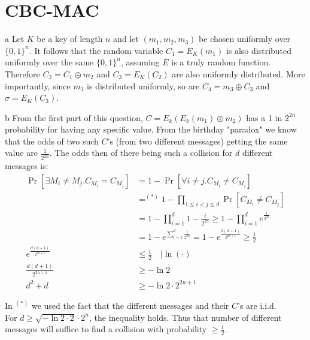 \documentclass{article}
\begin{document}
\section{CBC-MAC}
\begin{paragraph}
	a Let $K$ be a key of length $n$ and let $(m_1, m_2, m_3)$ be chosen uniformly over $\{0, 1\}^n$. It follows that the random variable $C_1 = E_K(m_1)$ is also distributed uniformly over the same $\{0, 1\}^n$, assuming $E$ is a truly random function. Therefore $C_2 = C_1 \oplus m_2$ and $C_3 = E_K(C_2)$ are also uniformly distributed. More importantly, since $m_3$ is distributed uniformly, so are $C_4 = m_3 \oplus C_3$ and $\sigma = E_K(C_3)$.
\end{paragraph}

\begin{paragraph}
    b From the first part of this question, $C = E_k(E_k(m_1) \oplus m_2)$ has a 1 in $2^{2n}$ probability for having any specific value. From the birthday "paradox" we know that the odds of two such $C$'s (from two different messages) getting the same value are $\frac{1}{2^{2n}}$. The odds then of there being such a collision for $d$ different messages is:
    \begin{align*}
        \Pr[\exists M_i \neq M_j. C_{M_i} = C_{M_j}] &= 1 - \Pr[\forall i \neq j. C_{M_i} \neq C_{M_j}]\\
        &=^{(*)} 1 - \prod\limits_{1 \leq i < j \leq d}\Pr[C_{M_i} \neq C_{M_j}]\\
        &= 1 - \prod\limits_{i = 1}^d 1 - \frac{i}{2^{2n}} \geq 1 - \prod\limits_{i = 1}^d e^{\frac{i}{2^{2n}}}\\
        &= 1 - e^{\sum\limits_{i = 1}^d\frac{i}{2^{2n}}} = 1 - e^{\frac{d (d + 1)}{2^{2n + 1}}} \geq \frac{1}{2}\\
        e^{\frac{d (d + 1)}{2^{2n + 1}}} &\leq \frac{1}{2} \quad |\ln (\cdot)\\
        \frac{d (d + 1)}{2^{2n + 1}} &\geq -\ln2\\
        d^2 + d &\geq -\ln2 \cdot 2^{2n+1}
    \end{align*}
    
    In $^{(*)}$ we used the fact that the different messages and their $C$'s are i.i.d.\\
    
    For $d \geq \sqrt{-\ln2 \cdot 2} \cdot 2^n$, the inequality holds. Thus that number of different messages will suffice to find a collision with probability $\geq \frac{1}{2}$.
\end{paragraph}
\end{document}
